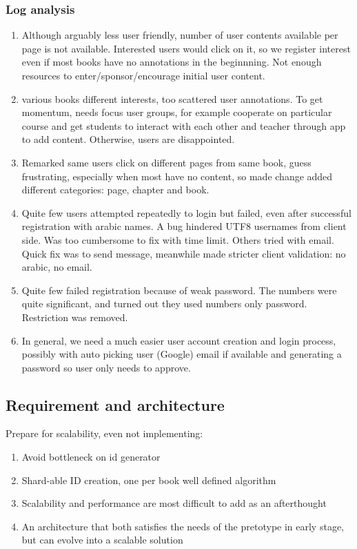 \documentclass[a4paper,10pt]{book}
\begin{document}
\subsubsection{Log analysis}

\begin{enumerate}
\item Although arguably less user friendly, number of user contents available per page is not available. Interested users would click on it, so
we register interest even if most books have no annotations in the beginnning. Not enough resources to enter/sponsor/encourage initial user 
content.
\item various books different interests, too scattered user annotations. To get momentum, needs focus user groups, for example cooperate on 
particular course and get students to interact with each other and teacher through app to add content. Otherwise, users are disappointed.
\item Remarked same users click on different pages from same book, guess frustrating, especially when most have no content, 
so made change added different categories: page, chapter and book.
\item Quite few users attempted repeatedly to login but failed, even after successful registration with arabic names. A bug hindered UTF8 
usernames from client side. Was too cumbersome to fix with time limit. Others tried with email. Quick fix was to send message, 
meanwhile made stricter client validation: no arabic, no email.
\item Quite few failed registration because of weak password. The numbers were quite significant, and turned out they used numbers only password.
Restriction was removed.
\item In general, we need a much easier user account creation and login process, possibly with auto picking user (Google) email if available
and generating a password so user only needs to approve.
\end{enumerate}

\subsection{Requirement and architecture}
Prepare for scalability, even not implementing:
\begin{enumerate}
\item Avoid bottleneck on id generator
\item Shard-able ID creation, one per book well defined algorithm
\item Scalability and performance are most difficult to add as an afterthought
\item An architecture that both satisfies the needs of the pretotype in early stage, but can evolve
    into a scalable solution
\end{enumerate}
\end{document}

